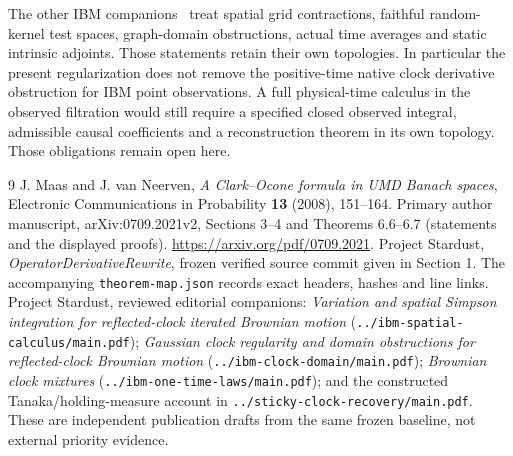 \documentclass[11pt]{article}
\begin{document}
The other IBM companions~\cite{companions} treat spatial grid
contractions, faithful random-kernel test spaces, graph-domain
obstructions, actual time averages and static intrinsic adjoints.
Those statements retain their own topologies. In particular the
present regularization does not remove the positive-time native
clock derivative obstruction for IBM point observations. A full
physical-time calculus in the observed filtration would still
require a specified closed observed integral, admissible causal
coefficients and a reconstruction theorem in its own topology.
Those obligations remain open here.

\begin{thebibliography}{9}
 J. Maas and J. van Neerven,
\emph{A Clark--Ocone formula in UMD Banach spaces},
Electronic Communications in Probability \textbf{13} (2008), 151--164.
Primary author manuscript, arXiv:0709.2021v2, Sections 3--4
and Theorems 6.6--6.7 (statements and the displayed proofs).
\url{https://arxiv.org/pdf/0709.2021}.
 Project Stardust, \emph{OperatorDerivativeRewrite},
frozen verified source commit given in Section 1. The accompanying
\texttt{theorem-map.json} records exact headers, hashes and line links.
 Project Stardust, reviewed editorial companions:
\emph{Variation and spatial Simpson integration for reflected-clock iterated Brownian motion}
(\texttt{../ibm-spatial-calculus/main.pdf});
\emph{Gaussian clock regularity and domain obstructions for reflected-clock Brownian motion}
(\texttt{../ibm-clock-domain/main.pdf});
\emph{Brownian clock mixtures}
(\texttt{../ibm-one-time-laws/main.pdf}); and the constructed
Tanaka/holding-measure account in
\texttt{../sticky-clock-recovery/main.pdf}.
These are independent publication drafts from the same frozen baseline,
not external priority evidence.
\end{thebibliography}
\end{document}
